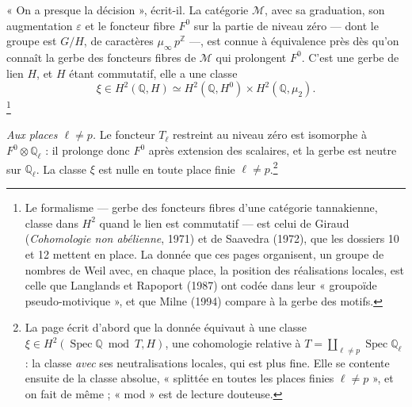 \documentclass[11pt,a4paper]{article}
\begin{document}
« On a presque la décision », écrit-il. La catégorie $\mathcal{M}$, avec sa
graduation, son augmentation $\varepsilon$ et le foncteur fibre $F^{0}$ sur la
partie de niveau zéro --- dont le groupe est $G/H$, de caractères
$\mu_{\infty}\, p^{\mathbb{Z}}$ ---, est connue à équivalence près dès qu'on
connaît la gerbe des foncteurs fibres de $\mathcal{M}$ qui prolongent $F^{0}$.
C'est une gerbe de lien $H$, et $H$ étant commutatif, elle a une classe
\[
  \xi \in H^{2}(\mathbb{Q}, H) \simeq H^{2}(\mathbb{Q}, H^{0}) \times
  H^{2}(\mathbb{Q}, \mu_{2}) .
\]
\footnote{Le formalisme --- gerbe des foncteurs fibres d'une catégorie
tannakienne, classe dans $H^{2}$ quand le lien est commutatif --- est celui de
Giraud (\emph{Cohomologie non abélienne}, 1971) et de Saavedra (1972), que les
dossiers 10 et 12 mettent en place. La donnée que ces pages organisent, un
groupe de nombres de Weil avec, en chaque place, la position des réalisations
locales, est celle que Langlands et Rapoport (1987) ont codée dans leur
« groupoïde pseudo-motivique », et que Milne (1994) compare à la gerbe des
motifs.}

\emph{Aux places $\ell \neq p$.} Le foncteur $T_{\ell}$ restreint au niveau
zéro est isomorphe à $F^{0} \otimes \mathbb{Q}_{\ell}$ : il prolonge donc $F^{0}$
après extension des scalaires, et la gerbe est neutre sur $\mathbb{Q}_{\ell}$.
La classe $\xi$ est nulle en toute place finie $\ell \neq
p$.\footnote{La page écrit d'abord que la donnée équivaut à une classe
$\xi \in H^{2}(\operatorname{Spec} \mathbb{Q} \bmod T, H)$, une cohomologie
relative à $T = \coprod_{\ell \neq p} \operatorname{Spec} \mathbb{Q}_{\ell}$ : la
classe \emph{avec} ses neutralisations locales, qui est plus fine. Elle se
contente ensuite de la classe absolue, « splittée en toutes les places finies
$\ell \neq p$ », et on fait de même ; « mod » est de lecture douteuse.}
\end{document}
